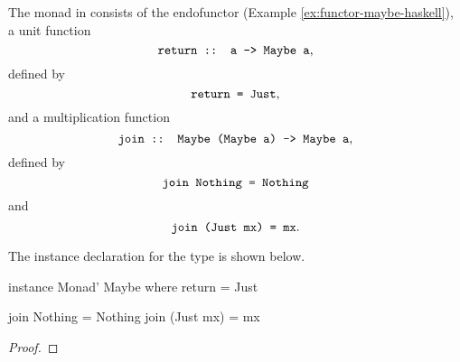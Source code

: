 \begin{example}
  \label{ex:monad-maybe-haskell}

  The  monad in \hask consists of the
   endofunctor (Example
  \ref{ex:functor-maybe-haskell}), a unit function
  \begin{equation*}
    \text{\texttt{return :: a -> Maybe a}}
    \text{,}
  \end{equation*}
  defined by
  \begin{equation}
    \label{eq:maybe-return}
    \text{\texttt{return = Just}}
    \text{,}
  \end{equation}
  and a multiplication function
  \begin{equation*}
    \text{\texttt{join :: Maybe (Maybe a) -> Maybe a}}
    \text{,}
  \end{equation*}
  defined by
  \begin{equation}
    \label{eq:maybe-join-nothing}
    \text{\texttt{join Nothing = Nothing}}
  \end{equation}
  and
  \begin{equation}
    \label{eq:maybe-join-just}
    \text{\texttt{join (Just mx) = mx}}
    \text{.}
  \end{equation}

  The  instance declaration for the
   type is shown below.
  \begin{codehaskell}
instance Monad' Maybe where
  return = Just

  join Nothing   = Nothing
  join (Just mx) = mx
  \end{codehaskell}

  \begin{proof}


\end{proof}
\end{example}
